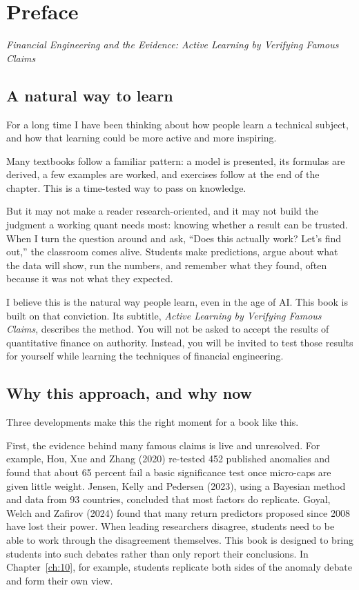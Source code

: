 \chapter*{Preface}

\emph{Financial Engineering and the Evidence: Active Learning by Verifying Famous Claims}

\section*{A natural way to learn}

For a long time I have been thinking about how people learn a technical subject, and how that learning could be more active and more inspiring.

Many textbooks follow a familiar pattern: a model is presented, its formulas are derived, a few examples are worked, and exercises follow at the end of the chapter. This is a time-tested way to pass on knowledge.

But it may not make a reader research-oriented, and it may not build the judgment a working quant needs most: knowing whether a result can be trusted. When I turn the question around and ask, ``Does this actually work? Let's find out,'' the classroom comes alive. Students make predictions, argue about what the data will show, run the numbers, and remember what they found, often because it was not what they expected.

I believe this is the natural way people learn, even in the age of AI. This book is built on that conviction. Its subtitle, \emph{Active Learning by Verifying Famous Claims}, describes the method. You will not be asked to accept the results of quantitative finance on authority. Instead, you will be invited to test those results for yourself while learning the techniques of financial engineering.

\section*{Why this approach, and why now}

Three developments make this the right moment for a book like this.

First, the evidence behind many famous claims is live and unresolved. For example, Hou, Xue and Zhang (2020) re-tested 452 published anomalies and found that about 65 percent fail a basic significance test once micro-caps are given little weight. Jensen, Kelly and Pedersen (2023), using a Bayesian method and data from 93 countries, concluded that most factors do replicate. Goyal, Welch and Zafirov (2024) found that many return predictors proposed since 2008 have lost their power. When leading researchers disagree, students need to be able to work through the disagreement themselves. This book is designed to bring students into such debates rather than only report their conclusions. In Chapter~\ref{ch:10}, for example, students replicate both sides of the anomaly debate and form their own view.

